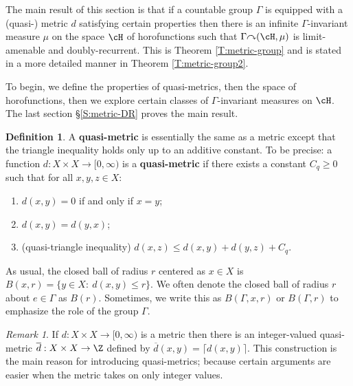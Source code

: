 \documentclass[12pt]{article}
\theoremstyle{plain}
\theoremstyle{definition}
\newtheorem{defn}{Definition}
\theoremstyle{remark}
\newtheorem{remark}{Remark}
\newcommand{\G}{\Gamma}
\def\cc{{\curvearrowright}}
\begin{document}
The main result of this section is that if a countable group $\G$ is equipped with a (quasi-) metric $d$ satisfying certain properties then there is an infinite $\G$-invariant measure $\mu$ on the space $\cH$ of horofunctions such that $\G \cc (\cH,\mu)$ is limit-amenable and doubly-recurrent. This is Theorem \ref{T:metric-group} and is stated in a more detailed manner in Theorem \ref{T:metric-group2}.

To begin, we define the properties of quasi-metrics, then the space of horofunctions, then we explore certain classes of $\G$-invariant measures on $\cH$. The last section \S \ref{S:metric-DR} proves the main result.


\begin{defn}\label{D:quasi-metric}
A {\bf quasi-metric} is essentially the same as a metric except that the triangle inequality holds only up to an additive constant. To be precise: a function $d:X \times X \to [0,\infty)$ is a {\bf quasi-metric} if there exists a constant $C_q\ge 0$ such that for all $x,y,z \in X$:
\begin{enumerate}
    \item $d(x,y)=0$ if and only if $x=y$;
    \item $d(x,y)=d(y,x)$;
    \item (quasi-triangle inequality) $d(x,z)\le d(x,y)+d(y,z)+C_q$.
\end{enumerate}
As usual, the closed ball of radius $r$ centered as $x\in X$ is $B(x,r)=\{y\in X:~d(x,y)\le r\}$. We often denote the closed ball of radius $r$ about $e\in\G$ as $B(r)$. Sometimes, we write this as $B(\G,x,r)$ or $B(\G,r)$ to emphasize the role of the group $\G$.
\end{defn}

\begin{remark}
    If $d:X \times X \to [0,\infty)$ is a metric then there is an integer-valued quasi-metric $\overline{d}:X\times X \to \Z$ defined by $\overline{d}(x,y) = \lceil d(x,y) \rceil$. This construction is the main reason for introducing quasi-metrics; because certain arguments are easier when the metric takes on only integer values.
\end{remark}
\end{document}
